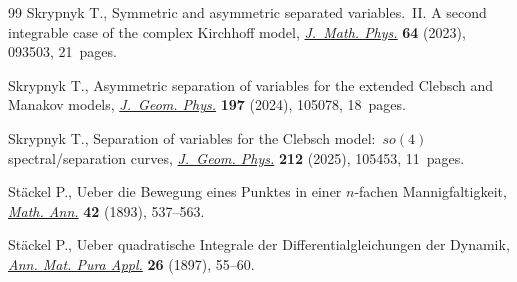 \documentclass[pdftex]{sigma}
\numberwithin{equation}{section}
\begin{document}
\begin{thebibliography}{99}
Skrypnyk T., Symmetric and asymmetric separated variables.~{II}. {A} second
 integrable case of the complex {K}irchhoff model,
 \href{https://doi.org/10.1063/5.0152882}{\textit{J.~Math. Phys.}} \textbf{64}
 (2023), 093503, 21~pages.

Skrypnyk T., Asymmetric separation of variables for the extended {C}lebsch and
 {M}anakov models,
 \href{https://doi.org/10.1016/j.geomphys.2023.105078}{\textit{J.~Geom.
 Phys.}} \textbf{197} (2024), 105078, 18~pages.

Skrypnyk T., Separation of variables for the {C}lebsch model:~{$so(4)$}
 spectral/separation curves,
 \href{https://doi.org/10.1016/j.geomphys.2025.105453}{\textit{J.~Geom.
 Phys.}} \textbf{212} (2025), 105453, 11~pages.

St\"ackel P., Ueber die {B}ewegung eines {P}unktes in einer {$n$}-fachen
 {M}annigfaltigkeit, \href{https://doi.org/10.1007/BF01447379}{\textit{Math.
 Ann.}} \textbf{42} (1893), 537--563.

St\"ackel P., Ueber quadratische Integrale der Differentialgleichungen der
 Dynamik, \href{https://doi.org/10.1007/BF02580501}{\textit{Ann. Mat. Pura
 Appl.}} \textbf{26} (1897), 55--60.

\end{thebibliography}\LastPageEnding
\end{document}
